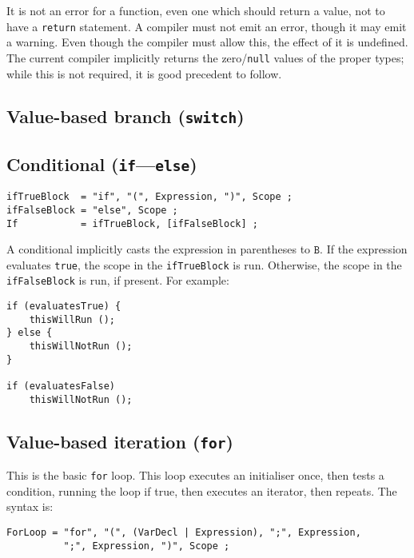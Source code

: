 \documentclass{article}
\newcommand{\R}[1]{\mathtt{#1}}
\begin{document}
It is not an error for a function, even one which should return a value, not
to have a \texttt{return} statement. A compiler must not emit an error, though
it may emit a warning. Even though the compiler must allow this, the effect of
it is undefined. The current compiler implicitly returns the
zero/\texttt{null} values of the proper types; while this is not required, it
is good precedent to follow.

\subsection{Value-based branch (\texttt{switch})}
\label{sub:statements:switch}

\subsection{Conditional (\texttt{if}---\texttt{else})}
\label{sub:statements:if}
\begin{verbatim}
ifTrueBlock  = "if", "(", Expression, ")", Scope ;
ifFalseBlock = "else", Scope ;
If           = ifTrueBlock, [ifFalseBlock] ;
\end{verbatim}

A conditional implicitly casts the expression in parentheses to $\R{B}$. If
the expression evaluates \texttt{true}, the scope in the \texttt{ifTrueBlock}
is run. Otherwise, the scope in the \texttt{ifFalseBlock} is run, if present.
For example:

\begin{verbatim}
if (evaluatesTrue) {
    thisWillRun ();
} else {
    thisWillNotRun ();
}

if (evaluatesFalse)
    thisWillNotRun ();
\end{verbatim}


\subsection{Value-based iteration (\texttt{for})}
\label{sub:statements:for}
This is the basic \texttt{for} loop. This loop executes an initialiser once,
then tests a condition, running the loop if true, then executes an iterator,
then repeats. The syntax is:

\begin{verbatim}
ForLoop = "for", "(", (VarDecl | Expression), ";", Expression,
          ";", Expression, ")", Scope ;
\end{verbatim}
\end{document}
